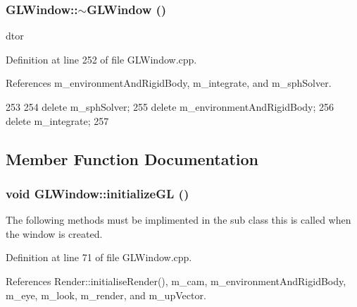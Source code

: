 \hypertarget{class_g_l_window_a2eeaea2148f4f72344edd6d1bac9759b}{
\subsubsection[{$\sim$GLWindow}]{\setlength{\rightskip}{0pt plus 5cm}GLWindow::$\sim$GLWindow ()}}
\label{class_g_l_window_a2eeaea2148f4f72344edd6d1bac9759b}


dtor 



Definition at line 252 of file GLWindow.cpp.



References m\_\-environmentAndRigidBody, m\_\-integrate, and m\_\-sphSolver.




\begin{DoxyCode}
253 {
254     delete m_sphSolver;
255     delete m_environmentAndRigidBody;
256     delete m_integrate;
257 }
\end{DoxyCode}




\subsection{Member Function Documentation}
\hypertarget{class_g_l_window_a39e39761cd7323806917a217cc7caea5}{
\subsubsection[{initializeGL}]{\setlength{\rightskip}{0pt plus 5cm}void GLWindow::initializeGL ()}}
\label{class_g_l_window_a39e39761cd7323806917a217cc7caea5}


The following methods must be implimented in the sub class this is called when the window is created. 



Definition at line 71 of file GLWindow.cpp.



References Render::initialiseRender(), m\_\-cam, m\_\-environmentAndRigidBody, m\_\-eye, m\_\-look, m\_\-render, and m\_\-upVector.





